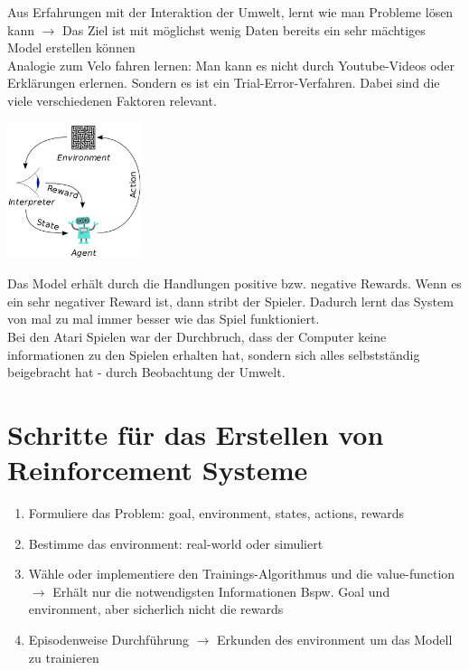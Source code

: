 \documentclass{article}
\newenvironment{Figure}
	{\par\medskip\noindent\minipage{\linewidth}}
	{\endminipage\par\medskip}
\theoremstyle{merke}
\theoremstyle{definition}
\begin{document}
Aus Erfahrungen mit der Interaktion der Umwelt, lernt wie man Probleme lösen kann $\rightarrow$ Das Ziel ist mit möglichst wenig Daten bereits ein sehr mächtiges Model erstellen können\\
Analogie zum Velo fahren lernen: Man kann es nicht durch Youtube-Videos oder Erklärungen erlernen. Sondern es ist ein Trial-Error-Verfahren. Dabei sind die viele verschiedenen Faktoren relevant.
\begin{Figure}
\centering
\includegraphics[width=150px]{img/ReinforcementLearningModel.png}
	\label{fig:Abbildung zum Ablauf ovn Reinforcement Learning}
\end{Figure}

Das Model erhält durch die Handlungen positive bzw. negative Rewards. Wenn es ein sehr negativer Reward ist, dann stribt der Spieler. Dadurch lernt das System von mal zu mal immer besser wie das Spiel funktioniert.\\
Bei den Atari Spielen war der Durchbruch, dass der Computer keine informationen zu den Spielen erhalten hat, sondern sich alles selbstständig beigebracht hat - durch Beobachtung der Umwelt.

\section{Schritte für das Erstellen von Reinforcement Systeme}
\begin{enumerate}
	\item Formuliere das Problem: goal, environment, states, actions, rewards 
	\item Bestimme das environment: real-world oder simuliert
	\item Wähle oder implementiere den Trainings-Algorithmus und die value-function $\rightarrow$ Erhält nur die notwendigsten Informationen Bspw. Goal und environment, aber sicherlich nicht die rewards
	\item Episodenweise Durchführung $\rightarrow$ Erkunden des environment um das Modell zu trainieren
\end{enumerate}
\end{document}
